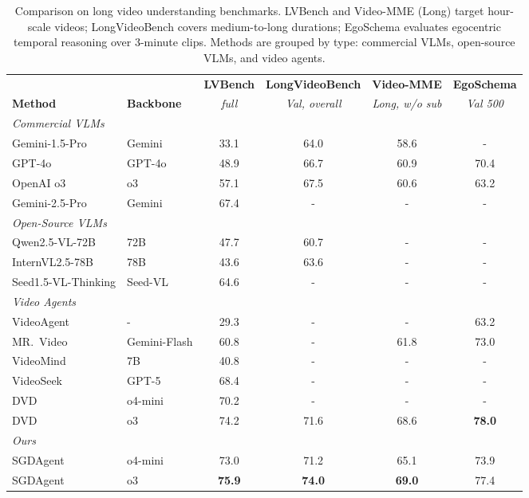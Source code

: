 \documentclass[sigconf, screen, review, anonymous]{acmart}
\begin{document}
\begin{table}[!tb]
  \centering
  \caption{Comparison on long video understanding benchmarks.
    LVBench\cite{lvbench} and Video-MME (Long)\cite{videomme2024} target hour-scale videos;
    LongVideoBench\cite{longvideobench2024} covers medium-to-long durations;
    EgoSchema\cite{egoschema2023} evaluates egocentric temporal reasoning over 3-minute clips.
    Methods are grouped by type: commercial VLMs, open-source VLMs,
    and video agents.}
  \vspace{-0.1in}
  \label{tab:main_comparison}
  \small
  \begin{tabular}{ll cccc}
    \toprule
    & & \textbf{LVBench} & \textbf{LongVideoBench} & \textbf{Video-MME} & \textbf{EgoSchema} \\
    \textbf{Method} & \textbf{Backbone}
    & \textit{full}
    & \textit{Val, overall}
    & \textit{Long, w/o sub}
    & \textit{Val 500} \\
    \midrule
    \multicolumn{6}{l}{\textit{Commercial VLMs}} \\
    Gemini-1.5-Pro\cite{gemini15}
      & Gemini        & 33.1 & 64.0 & 58.6 & -   \\
    GPT-4o\cite{gpt4o}
      & GPT-4o        & 48.9 & 66.7 & 60.9 & 70.4 \\
    OpenAI o3\cite{o3}
      & o3            & 57.1 & 67.5 & 60.6 & 63.2 \\
    Gemini-2.5-Pro\cite{gemini25}
      & Gemini        & 67.4 & -   & -   & -   \\
    \midrule
    \multicolumn{6}{l}{\textit{Open-Source VLMs}} \\
    Qwen2.5-VL-72B\cite{qwen}
      & 72B           & 47.7 & 60.7 & -   & -   \\
    InternVL2.5-78B\cite{internvl}
      & 78B           & 43.6 & 63.6 & -   & -   \\
    Seed1.5-VL-Thinking\cite{seed}
      & Seed-VL       & 64.6 & -   & -   & -   \\
    \midrule
    \multicolumn{6}{l}{\textit{Video Agents}} \\
    VideoAgent\cite{videoagent}
      & -            & 29.3 & -   & -   & 63.2 \\
    MR.~Video\cite{mrvideo}
      & Gemini-Flash  & 60.8 & -   & 61.8 & 73.0 \\
    VideoMind\cite{videomind}
      & 7B            & 40.8 & -   & -   & -   \\
    VideoSeek\cite{videoseek}
      & GPT-5         & 68.4 & -   & -   & -   \\
    DVD\cite{deepvideo2025}
      & o4-mini       & 70.2 & -   & -   & -   \\
    DVD\cite{deepvideo2025}
      & o3            & 74.2 & 71.6 & 68.6 & \textbf{78.0} \\
    \midrule
    \multicolumn{6}{l}{\textit{Ours}} \\
    SGDAgent
      & o4-mini       & 73.0 & 71.2 & 65.1 & 73.9 \\
    SGDAgent
      & o3            & \textbf{75.9} & \textbf{74.0} & \textbf{69.0} & 77.4 \\
    \bottomrule
  \end{tabular}
\end{table}
\end{document}
